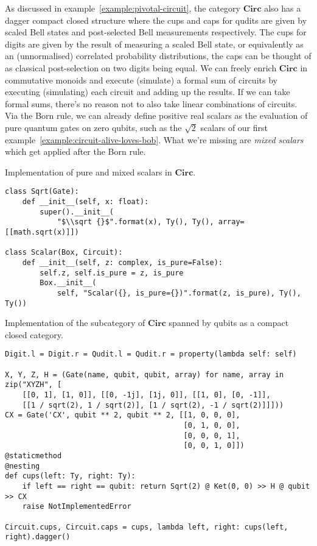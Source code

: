 As discussed in example~\ref{example:pivotal-circuit}, the category $\mathbf{Circ}$ also has a dagger compact closed structure where the cups and caps for qudits are given by scaled Bell states and post-selected Bell measurements respectively.
The cups for digits are given by the result of measuring a scaled Bell state, or equivalently as an (unnormalised) correlated probability distributions, the caps can be thought of as classical post-selection on two digits being equal.
We can freely enrich $\mathbf{Circ}$ in commutative monoids and execute (simulate) a formal sum of circuits by executing (simulating) each circuit and adding up the results.
If we can take formal sums, there's no reason not to also take linear combinations of circuits.
Via the Born rule, we can already define positive real scalars as the evaluation of pure quantum gates on zero qubits, such as the $\sqrt 2$ scalars of our first example~\ref{example:circuit-alive-loves-bob}.
What we're missing are \emph{mixed scalars} which get applied after the Born rule.

\begin{python}\label{listing:mixed-scalars}
{\normalfont Implementation of pure and mixed scalars in $\mathbf{Circ}$.}

\begin{verbatim}
class Sqrt(Gate):
    def __init__(self, x: float):
        super().__init__(
            "$\\sqrt {}$".format(x), Ty(), Ty(), array=[[math.sqrt(x)]])

class Scalar(Box, Circuit):
    def __init__(self, z: complex, is_pure=False):
        self.z, self.is_pure = z, is_pure
        Box.__init__(
            self, "Scalar({}, is_pure={})".format(z, is_pure), Ty(), Ty())
\end{verbatim}
\end{python}

\begin{python}
{\normalfont Implementation of the subcategory of $\mathbf{Circ}$ spanned by qubits as a compact closed category.}

\begin{verbatim}
Digit.l = Digit.r = Qudit.l = Qudit.r = property(lambda self: self)

X, Y, Z, H = (Gate(name, qubit, qubit, array) for name, array in zip("XYZH", [
    [[0, 1], [1, 0]], [[0, -1j], [1j, 0]], [[1, 0], [0, -1]],
    [[1 / sqrt(2), 1 / sqrt(2)], [1 / sqrt(2), -1 / sqrt(2)]]]))
CX = Gate('CX', qubit ** 2, qubit ** 2, [[1, 0, 0, 0],
                                         [0, 1, 0, 0],
                                         [0, 0, 0, 1],
                                         [0, 0, 1, 0]])
@staticmethod
@nesting
def cups(left: Ty, right: Ty):
    if left == right == qubit: return Sqrt(2) @ Ket(0, 0) >> H @ qubit >> CX
    raise NotImplementedError

Circuit.cups, Circuit.caps = cups, lambda left, right: cups(left, right).dagger()
\end{verbatim}
\end{python}

